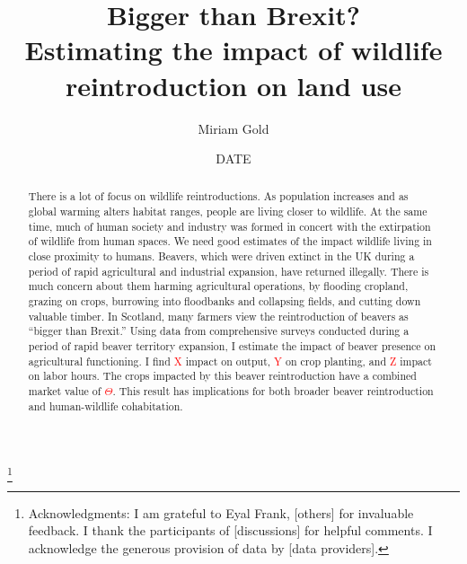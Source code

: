 \documentclass[11pt, english, letterpaper]{article}
\begin{document}
\justifying

\title{Bigger than Brexit? \\ Estimating the impact of wildlife reintroduction on land use} \thanks{Acknowledgments: I am grateful to Eyal Frank, [others] for invaluable feedback. I thank the participants of [discussions] for helpful comments. I acknowledge the generous provision of data by [data providers].}

\author[1]{\small Miriam Gold}

\date{DATE}
\maketitle


\begin{abstract}
    \singlespacing 
    There is a lot of focus on wildlife reintroductions. As population increases and as global warming alters habitat ranges, people are living closer to wildlife. At the same time, much of human society and industry was formed in concert with the extirpation of wildlife from human spaces. We need good estimates of the impact wildlife living in close proximity to humans. Beavers, which were driven extinct in the UK during a period of rapid agricultural and industrial expansion, have returned illegally. There is much concern about them harming agricultural operations, by flooding cropland, grazing on crops, burrowing into floodbanks and collapsing fields, and cutting down valuable timber. In Scotland, many farmers view the reintroduction of beavers as ``bigger than Brexit.'' Using data from comprehensive surveys conducted during a period of rapid beaver territory expansion, I estimate the impact of beaver presence on agricultural functioning. I find \textcolor{red}{X} impact on output, \textcolor{red}{Y} on crop planting, and \textcolor{red}{Z} impact on labor hours. The crops impacted by this beaver reintroduction have a combined market value of \textcolor{red}{$\Theta$}. This result has implications for both broader beaver reintroduction and human-wildlife cohabitation. 
\end{abstract}
\end{document}
